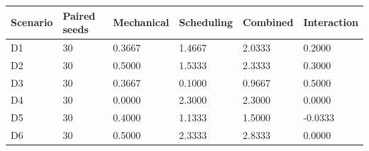 \begin{tabular}{llllll}
\toprule
Scenario & Paired seeds & Mechanical & Scheduling & Combined & Interaction \\
\midrule
D1 & 30 & 0.3667 & 1.4667 & 2.0333 & 0.2000 \\
D2 & 30 & 0.5000 & 1.5333 & 2.3333 & 0.3000 \\
D3 & 30 & 0.3667 & 0.1000 & 0.9667 & 0.5000 \\
D4 & 30 & 0.0000 & 2.3000 & 2.3000 & 0.0000 \\
D5 & 30 & 0.4000 & 1.1333 & 1.5000 & -0.0333 \\
D6 & 30 & 0.5000 & 2.3333 & 2.8333 & 0.0000 \\
\bottomrule
\end{tabular}
